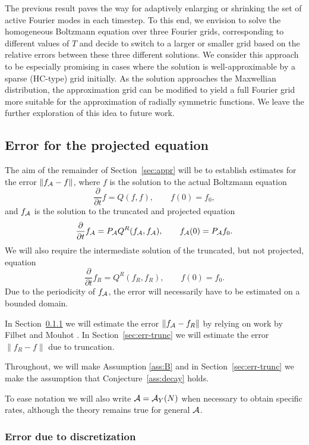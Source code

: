 \begin{remark}
    The previous result paves the way for adaptively enlarging or shrinking
    the set of active Fourier modes in each timestep.  To this end, we envision
    to solve the homogeneous Boltzmann equation over three Fourier grids,
    corresponding to different values of $T$ and decide to switch to a
    larger or smaller grid based on the relative errors between these three
    different solutions.  We consider this approach to be especially promising
    in cases where the solution is well-approximable by a sparse (HC-type) grid
    initially. As the solution approaches the Maxwellian distribution, the
    approximation grid can be modified to yield a full Fourier grid more
    suitable for the approximation of radially symmetric functions.  We leave
    the further exploration of this idea to future work.
\end{remark}

\subsection{Error for the projected equation} \label{sec:evolerr}

The aim of the remainder of Section~\ref{sec:appr} will be to establish
estimates for the error $\|f_{\mathcal{A}} - f\|$, where $f$ is the solution to the actual
Boltzmann equation
\[
    \frac{\partial}{\partial t}{f} = Q(f,f), \qquad f(0) = f_0,
\]
and $f_{\mathcal{A}}$ is the solution to the truncated and projected equation
\[
    \frac{\partial}{\partial t}{f}_{\mathcal{A}} = P_{\mathcal{A}} Q^R(f_{\mathcal{A}}, f_{\mathcal{A}}), \qquad f_{\mathcal{A}}(0) = P_{\mathcal{A}} f_0.
\]
We will also require the intermediate solution of the truncated, but not
projected, equation
\[
    \frac{\partial}{\partial t}{f}_R = Q^R(f_R, f_R), \qquad f(0) = f_0.
\]
Due to the periodicity of $f_{\mathcal{A}}$, the error will necessarily have to be
estimated on a bounded domain.

In Section~\ref{sec:extfilb} we will estimate the error $\|f_{\mathcal{A}}-f_R\|$ by relying
on work by Filbet and Mouhot \cite{Filbet2011asm}. In Section~\ref{sec:err-trunc} we
will estimate the error $\|f_R-f\|$ due to truncation.

Throughout, we will make Assumption \ref{ass:B} and in Section~\ref{sec:err-trunc}
we make the assumption that Conjecture~\ref{ass:decay} holds.

To ease notation we will also write $\mathcal{A}=\mathcal{A}_Y(N)$ when necessary to obtain specific rates, although the
theory remains true for general $\mathcal{A}$.

\subsubsection{Error due to discretization} \label{sec:extfilb}

